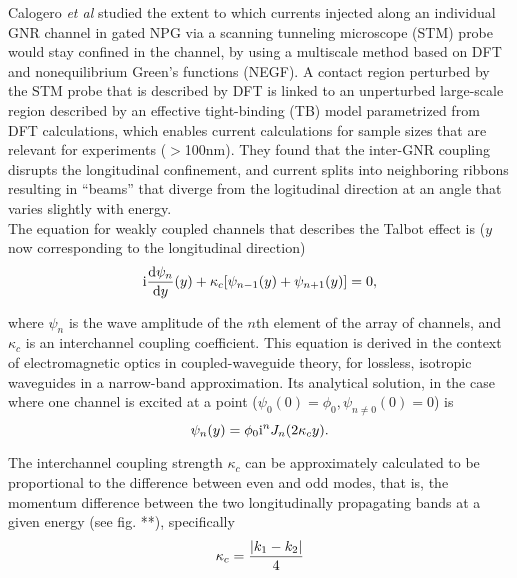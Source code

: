 Calogero \textit{et al}\parencite{Calogero2019} studied the extent to which currents injected along an individual GNR channel in gated NPG via a scanning tunneling microscope (STM) probe would stay confined in the channel, by using a multiscale method based on DFT and nonequilibrium Green’s functions (NEGF). A contact region perturbed by the STM probe that is described by DFT  is linked to an unperturbed large-scale region described by an effective tight-binding (TB) model parametrized from DFT calculations, which enables current calculations for sample sizes that are relevant for experiments (\(>\)100nm). They found that the inter-GNR coupling disrupts the longitudinal confinement, and current splits into neighboring ribbons resulting in ``beams'' that diverge from the logitudinal direction at an angle that varies slightly with energy.\\

The equation for weakly coupled channels that describes the Talbot effect is\parencite{Calogero2019} (\(y\) now corresponding to the longitudinal direction)
\begin{equation}
	\mathrm{i}\frac{\mathrm{d}{\psi_n}}{\mathrm{d}{y}}(y)+\kappa_c\qty[\psi_{n-1}(y)+\psi_{n+1}(y)]=0,
\end{equation}

where \(\psi_n\) is the wave amplitude of the \(n\)th element of the array of channels, and \(\kappa_c\) is an interchannel coupling coefficient. This equation is derived in the context of electromagnetic optics in coupled-waveguide theory, for lossless, isotropic waveguides in a narrow-band approximation\parencite{Yariv1984}. Its analytical solution, in the case where one channel is excited at a point (\(\psi_0(0)=\phi_0, \psi_{n\neq0}(0)=0\)) is\parencite{Jones1965}
\begin{equation}
\label{talbot_sol}
\psi_n(y)=\phi_0\mathrm{i}^nJ_n(2\kappa_cy).
\end{equation}

The interchannel coupling strength \(\kappa_c\) can be approximately calculated to be proportional to the difference between even and odd modes\parencite{Fan2014, Wang2017}, that is, the momentum difference between the two longitudinally propagating bands at a given energy (see fig. **), specifically
\begin{equation}
\kappa_c=\frac{\abs{k_1-k_2}}4
\end{equation}

